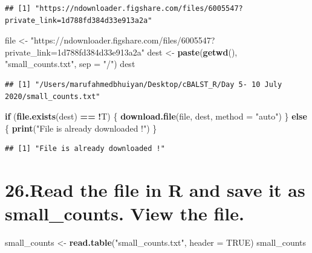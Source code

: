 \documentclass[]{article}
\newenvironment{Shaded}{\begin{snugshade}}{\end{snugshade}}
\newcommand{\ControlFlowTok}[1]{\textcolor[rgb]{0.13,0.29,0.53}{\textbf{#1}}}
\newcommand{\DataTypeTok}[1]{\textcolor[rgb]{0.13,0.29,0.53}{#1}}
\newcommand{\KeywordTok}[1]{\textcolor[rgb]{0.13,0.29,0.53}{\textbf{#1}}}
\newcommand{\NormalTok}[1]{#1}
\newcommand{\OperatorTok}[1]{\textcolor[rgb]{0.81,0.36,0.00}{\textbf{#1}}}
\newcommand{\OtherTok}[1]{\textcolor[rgb]{0.56,0.35,0.01}{#1}}
\newcommand{\StringTok}[1]{\textcolor[rgb]{0.31,0.60,0.02}{#1}}
\begin{document}
\begin{verbatim}
## [1] "https://ndownloader.figshare.com/files/6005547?private_link=1d788fd384d33e913a2a"
\end{verbatim}

\begin{Shaded}
\begin{Highlighting}[]
\NormalTok{file <-}\StringTok{ "https://ndownloader.figshare.com/files/6005547?private_link=1d788fd384d33e913a2a"}
\NormalTok{dest <-}\StringTok{ }\KeywordTok{paste}\NormalTok{(}\KeywordTok{getwd}\NormalTok{(), }\StringTok{"small_counts.txt"}\NormalTok{, }\DataTypeTok{sep =} \StringTok{"/"}\NormalTok{)}
\NormalTok{dest}
\end{Highlighting}
\end{Shaded}

\begin{verbatim}
## [1] "/Users/marufahmedbhuiyan/Desktop/cBALST_R/Day 5- 10 July 2020/small_counts.txt"
\end{verbatim}

\begin{Shaded}
\begin{Highlighting}[]
\ControlFlowTok{if}\NormalTok{ (}\KeywordTok{file.exists}\NormalTok{(dest) }\OperatorTok{==}\StringTok{ }\OperatorTok{!}\NormalTok{T) \{}
  \KeywordTok{download.file}\NormalTok{(file, dest, }\DataTypeTok{method =} \StringTok{"auto"}\NormalTok{)}
\NormalTok{\} }\ControlFlowTok{else}\NormalTok{ \{}
  \KeywordTok{print}\NormalTok{(}\StringTok{"File is already downloaded !"}\NormalTok{)}
\NormalTok{\}}
\end{Highlighting}
\end{Shaded}

\begin{verbatim}
## [1] "File is already downloaded !"
\end{verbatim}

\hypertarget{read-the-file-in-r-and-save-it-as-small_counts.-view-the-file.}{%
\section{26.Read the file in R and save it as small\_counts. View the
file.}\label{read-the-file-in-r-and-save-it-as-small_counts.-view-the-file.}}

\begin{Shaded}
\begin{Highlighting}[]
\NormalTok{small_counts <-}\StringTok{ }\KeywordTok{read.table}\NormalTok{(}\StringTok{"small_counts.txt"}\NormalTok{, }\DataTypeTok{header =} \OtherTok{TRUE}\NormalTok{)}
\NormalTok{small_counts}
\end{Highlighting}
\end{Shaded}
\end{document}
